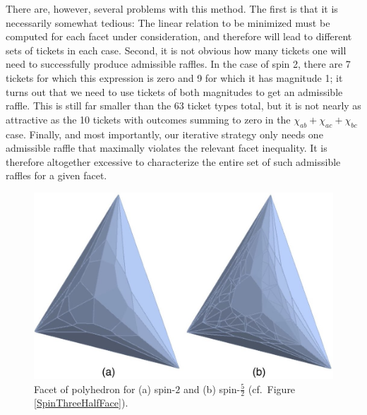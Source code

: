 There are, however, several problems with this method. The first is that it is necessarily somewhat tedious: The linear relation to be minimized must be computed for each facet under consideration, and therefore will lead to different sets of tickets in each case. Second, it is not obvious how many tickets one will need to successfully produce admissible raffles. In the case of spin 2, there are 7 tickets for which this expression is zero and 9 for which it has magnitude 1; it turns out that we need to use tickets of both magnitudes to get an admissible raffle. This is still far smaller than the 63 ticket types total, but it is not nearly as attractive as the 10 tickets with outcomes summing to zero in the $\chi_{ab}+\chi_{ac}+\chi_{bc}$ case. Finally, and most importantly, our iterative strategy only needs one admissible raffle that maximally violates the relevant facet inequality. It is therefore altogether excessive to characterize the entire set of such admissible raffles for a given facet.

\begin{figure}[h]
 \centering
   \includegraphics[width=5.5in]{FacetsSpin2Spin52.jpeg} 
   \caption{Facet of polyhedron for (a) spin-$2$ and (b) spin-$\frac52$ (cf.\ Figure \ref{SpinThreeHalfFace}).}
   \label{FacetsSpin2Spin52}
\end{figure}

